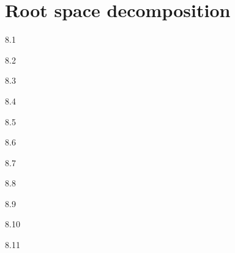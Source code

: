 \chapter{Root space decomposition}

\begin{solution}{}{8.1}
    
\end{solution}

\begin{solution}{}{8.2}

\end{solution}

\begin{solution}{}{8.3}
    
\end{solution}

\begin{solution}{}{8.4}

\end{solution}

\begin{solution}{}{8.5}
    
\end{solution}

\begin{solution}{}{8.6}

\end{solution}

\begin{solution}{}{8.7}
    
\end{solution}

\begin{solution}{}{8.8}

\end{solution}

\begin{solution}{}{8.9}
    
\end{solution}

\begin{solution}{}{8.10}

\end{solution}

\begin{solution}{}{8.11}
    
\end{solution}